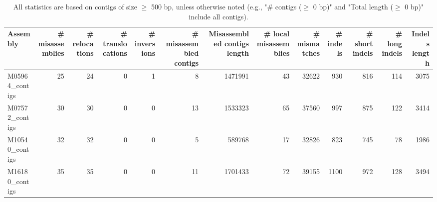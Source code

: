 \documentclass[12pt,a4paper]{article}
\begin{document}
\begin{table}[ht]
\begin{center}
\caption{All statistics are based on contigs of size $\geq$ 500 bp, unless otherwise noted (e.g., "\# contigs ($\geq$ 0 bp)" and "Total length ($\geq$ 0 bp)" include all contigs).}
\begin{tabular}{|l*{12}{|r}|}
\hline
Assembly & \# misassemblies &     \# relocations &     \# translocations &     \# inversions & \# misassembled contigs & Misassembled contigs length & \# local misassemblies & \# mismatches & \# indels &     \# short indels &     \# long indels & Indels length \\ \hline
M05964\_contigs & 25 & 24 & 0 & 1 & 8 & 1471991 & 43 & 32622 & 930 & 816 & 114 & 3075 \\ \hline
M07572\_contigs & 30 & 30 & 0 & 0 & 13 & 1533323 & 65 & 37560 & 997 & 875 & 122 & 3414 \\ \hline
M10540\_contigs & 32 & 32 & 0 & 0 & 5 & 589768 & 17 & 32826 & 823 & 745 & 78 & 1986 \\ \hline
M16180\_contigs & 35 & 35 & 0 & 0 & 11 & 1701433 & 72 & 39155 & 1100 & 972 & 128 & 3494 \\ \hline
\end{tabular}
\end{center}
\end{table}
\end{document}
